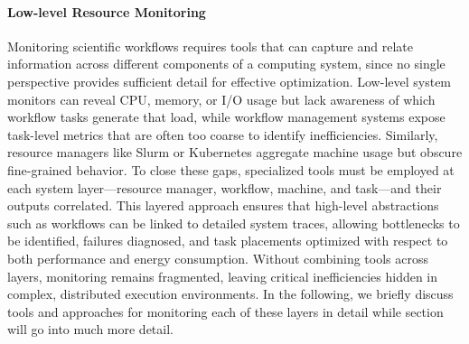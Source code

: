 \paragraph{Low-level Resource Monitoring}
Monitoring scientific workflows requires tools that can capture and relate information across different components of a computing system, since no single perspective provides sufficient detail for effective optimization. Low-level system monitors can reveal CPU, memory, or I/O usage but lack awareness of which workflow tasks generate that load, while workflow management systems expose task-level metrics that are often too coarse to identify inefficiencies. Similarly, resource managers like Slurm or Kubernetes aggregate machine usage but obscure fine-grained behavior. To close these gaps, specialized tools must be employed at each system layer—resource manager, workflow, machine, and task—and their outputs correlated. This layered approach ensures that high-level abstractions such as workflows can be linked to detailed system traces, allowing bottlenecks to be identified, failures diagnosed, and task placements optimized with respect to both performance and energy consumption. Without combining tools across layers, monitoring remains fragmented, leaving critical inefficiencies hidden in complex, distributed execution environments. In the following, we briefly discuss tools and approaches for monitoring each of these layers in detail while section %
will go into much more detail.

